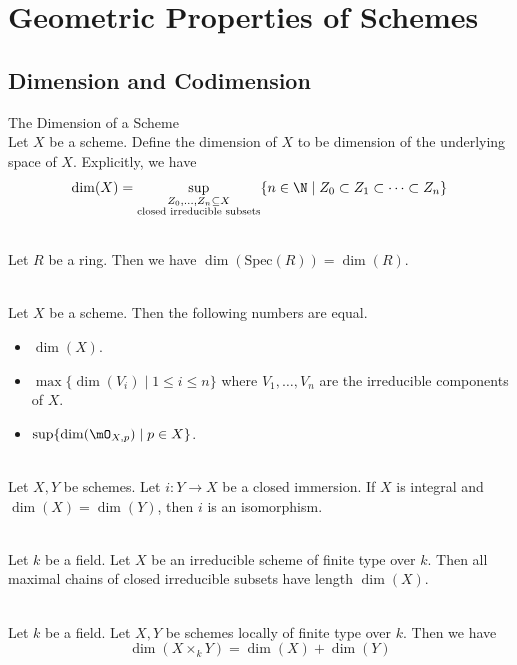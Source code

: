 \documentclass[a4paper]{article}
\begin{document}
\pagebreak
\section{Geometric Properties of Schemes}
\subsection{Dimension and Codimension}
\begin{defn}{The Dimension of a Scheme}{}\\
Let $X$ be a scheme. Define the dimension of $X$ to be dimension of the underlying space of $X$. Explicitly, we have $$\dim(X)=\sup_{\substack{Z_0,\dots,Z_n\subseteq X\\\text{closed irreducible subsets}}}\{n\in\N\;|\;Z_0\subset Z_1\subset\dots\subset Z_n\}$$
\end{defn}

\begin{eg}{}{}\\
Let $R$ be a ring. Then we have $\dim(\text{Spec}(R))=\dim(R)$. 
\end{eg}

\begin{prp}{}{}\\
Let $X$ be a scheme. Then the following numbers are equal. 
\begin{itemize}
\item $\dim(X)$. 
\item $\max\{\dim(V_i)\;|\;1\leq i\leq n\}$ where $V_1,\dots,V_n$ are the irreducible components of $X$. 
\item $\sup\{\dim(\mO_{X,p})\;|\;p\in X\}$. 
\end{itemize}
\end{prp}

\begin{prp}{}{}\\
Let $X,Y$ be schemes. Let $i:Y\to X$ be a closed immersion. If $X$ is integral and $\dim(X)=\dim(Y)$, then $i$ is an isomorphism. 
\end{prp}

\begin{prp}{}{}\\
Let $k$ be a field. Let $X$ be an irreducible scheme of finite type over $k$. Then all maximal chains of closed irreducible subsets have length $\dim(X)$. 
\end{prp}

\begin{prp}{}{}\\
Let $k$ be a field. Let $X,Y$ be schemes locally of finite type over $k$. Then we have $$\dim(X\times_kY)=\dim(X)+\dim(Y)$$
\end{prp}
\end{document}
